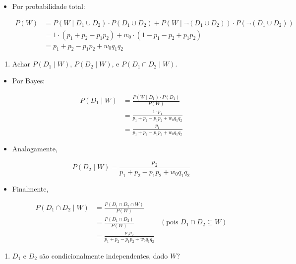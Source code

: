 \documentclass[
  11pt]{report}
\providecommand{\tightlist}{%
  \setlength{\itemsep}{0pt}\setlength{\parskip}{0pt}}
\begin{document}
\begin{itemize}
\item
  Por probabilidade total:

  \[
  \begin{aligned}
  P(W) 
  &= P(W \mid D_1 \cup D_2) \cdot P(D_1 \cup D_2) +
  P(W \mid \neg(D_1 \cup D_2)) \cdot P(\neg(D_1 \cup D_2)) \\
  &= 1 \cdot (p_1 + p_2 - p_1p_2) + w_0 \cdot (1 - p_1 - p_2 + p_1p_2) \\
  &= p_1 + p_2 - p_1p_2 + w_0q_1q_2 
  \end{aligned}
  \]
\end{itemize}

\begin{rmdbox}

\begin{enumerate}
\def\labelenumi{\alph{enumi}.}
\setcounter{enumi}{1}
\tightlist
\item
  Achar $P(D_1 \mid W)$, $P(D_2 \mid W)$, e $P(D_1 \cap D_2 \mid W)$.
\end{enumerate}

\end{rmdbox}

\begin{itemize}
\item
  Por Bayes:

  \[
  \begin{aligned}
    P(D_1 \mid W) 
    &= \frac{P(W \mid D_1) \cdot P(D_1)}{P(W)} \\
    &= \frac{1 \cdot p_1}{p_1 + p_2 - p_1p_2 + w_0q_1q_2} \\
    &= \frac{p_1}{p_1 + p_2 - p_1p_2 + w_0q_1q_2}
  \end{aligned}
  \]
\item
  Analogamente,

  \[
  P(D_2 \mid W) = \frac{p_2}{p_1 + p_2 - p_1p_2 + w_0q_1q_2}
  \]
\item
  Finalmente,

  \[
  \begin{aligned}
  P(D_1 \cap D_2 \mid W)
  &= \frac{P(D_1 \cap D_2 \cap W)}{P(W)} \\
  &= \frac{P(D_1 \cap D_2)}{P(W)} & (\text{pois }D_1 \cap D_2 \subseteq W)\\
  &= \frac{p_1p_2}{p_1 + p_2 - p_1p_2 + w_0q_1q_2}
  \end{aligned}
  \]
\end{itemize}

\begin{rmdbox}

\begin{enumerate}
\def\labelenumi{\alph{enumi}.}
\setcounter{enumi}{2}
\tightlist
\item
  $D_1$ e $D_2$ são condicionalmente independentes, dado $W$?
\end{enumerate}

\end{rmdbox}
\end{document}
